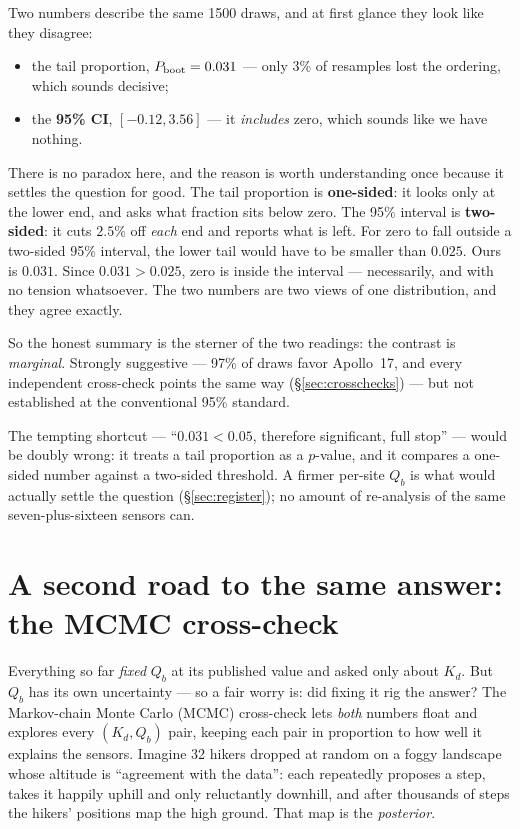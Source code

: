 \documentclass[11pt]{report}
\begin{document}
Two numbers describe the same 1500 draws, and at first glance they look like
they disagree:
\begin{itemize}[leftmargin=1.4em,itemsep=2pt]
\item the tail proportion, $P_{\rm boot} = 0.031$ --- only 3\% of resamples
  lost the ordering, which sounds decisive;
\item the \textbf{95\% CI}, $[-0.12, 3.56]$ --- it \emph{includes} zero, which
  sounds like we have nothing.
\end{itemize}

\begin{keypt}
There is no paradox here, and the reason is worth understanding once because
it settles the question for good. The tail proportion is \textbf{one-sided}:
it looks only at the lower end, and asks what fraction sits below zero. The
95\% interval is \textbf{two-sided}: it cuts $2.5\%$ off \emph{each} end and
reports what is left. For zero to fall outside a two-sided 95\% interval, the
lower tail would have to be smaller than $0.025$. Ours is $0.031$. Since
$0.031 > 0.025$, zero is inside the interval --- necessarily, and with no
tension whatsoever. The two numbers are two views of one distribution, and
they agree exactly.
\end{keypt}

\noindent So the honest summary is the sterner of the two readings: the
contrast is \emph{marginal}. Strongly suggestive --- 97\% of draws favor
Apollo~17, and every independent cross-check points the same way
(\S\ref{sec:crosschecks}) --- but not established at the conventional 95\%
standard.

\begin{warn}
The tempting shortcut --- ``$0.031<0.05$, therefore significant, full stop''
--- would be doubly wrong: it treats a tail proportion as a $p$-value, and it
compares a one-sided number against a two-sided threshold. A firmer per-site
$Q_b$ is what would actually settle the question (\S\ref{sec:register}); no
amount of re-analysis of the same seven-plus-sixteen sensors can.
\end{warn}

\section{A second road to the same answer: the MCMC
cross-check}\label{sec:mcmczero}

\begin{plain}
Everything so far \emph{fixed} $Q_b$ at its published value and asked only
about $K_d$. But $Q_b$ has its own uncertainty --- so a fair worry is: did
fixing it rig the answer? The Markov-chain Monte Carlo (MCMC) cross-check
lets \emph{both} numbers float and explores every $(K_d, Q_b)$ pair, keeping
each pair in proportion to how well it explains the sensors. Imagine 32
hikers dropped at random on a foggy landscape whose altitude is ``agreement
with the data'': each repeatedly proposes a step, takes it happily uphill and
only reluctantly downhill, and after thousands of steps the hikers' positions
map the high ground. That map is the \emph{posterior}.
\end{plain}
\end{document}
